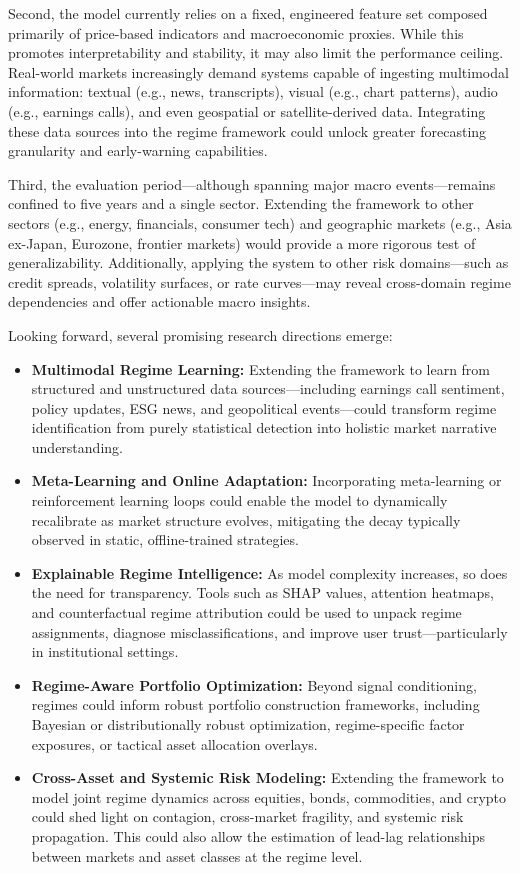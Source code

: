 Second, the model currently relies on a fixed, engineered feature set composed primarily of price-based indicators and macroeconomic proxies. While this promotes interpretability and stability, it may also limit the performance ceiling. Real-world markets increasingly demand systems capable of ingesting multimodal information: textual (e.g., news, transcripts), visual (e.g., chart patterns), audio (e.g., earnings calls), and even geospatial or satellite-derived data. Integrating these data sources into the regime framework could unlock greater forecasting granularity and early-warning capabilities.

Third, the evaluation period—although spanning major macro events—remains confined to five years and a single sector. Extending the framework to other sectors (e.g., energy, financials, consumer tech) and geographic markets (e.g., Asia ex-Japan, Eurozone, frontier markets) would provide a more rigorous test of generalizability. Additionally, applying the system to other risk domains—such as credit spreads, volatility surfaces, or rate curves—may reveal cross-domain regime dependencies and offer actionable macro insights.

Looking forward, several promising research directions emerge:

\begin{itemize}
    \item \textbf{Multimodal Regime Learning:} Extending the framework to learn from structured and unstructured data sources—including earnings call sentiment, policy updates, ESG news, and geopolitical events—could transform regime identification from purely statistical detection into holistic market narrative understanding.
    \item \textbf{Meta-Learning and Online Adaptation:} Incorporating meta-learning or reinforcement learning loops could enable the model to dynamically recalibrate as market structure evolves, mitigating the decay typically observed in static, offline-trained strategies.
    \item \textbf{Explainable Regime Intelligence:} As model complexity increases, so does the need for transparency. Tools such as SHAP values, attention heatmaps, and counterfactual regime attribution could be used to unpack regime assignments, diagnose misclassifications, and improve user trust—particularly in institutional settings.
    \item \textbf{Regime-Aware Portfolio Optimization:} Beyond signal conditioning, regimes could inform robust portfolio construction frameworks, including Bayesian or distributionally robust optimization, regime-specific factor exposures, or tactical asset allocation overlays.
    \item \textbf{Cross-Asset and Systemic Risk Modeling:} Extending the framework to model joint regime dynamics across equities, bonds, commodities, and crypto could shed light on contagion, cross-market fragility, and systemic risk propagation. This could also allow the estimation of lead-lag relationships between markets and asset classes at the regime level.
\end{itemize}

